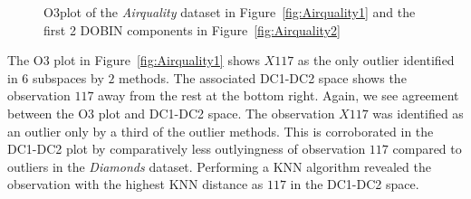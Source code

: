 \documentclass[11pt]{article}
\begin{document}
\begin{figure}
	\centering
	\caption{O3plot of the \textit{Airquality} dataset in Figure~\ref{fig:Airquality1} and the first 2 DOBIN components in Figure~\ref{fig:Airquality2} }
	\label{fig:Airquality}
\end{figure}
The O3 plot in Figure~\ref{fig:Airquality1} shows $X117$ as the only outlier identified in $6$ subspaces by $2$ methods. The associated DC1-DC2 space shows the observation $117$ away from the rest at the bottom right. Again, we see agreement between the O3 plot and DC1-DC2 space. The observation $X117$ was identified as an outlier only by a third of the outlier methods. This is corroborated in the DC1-DC2 plot by comparatively less outlyingness of observation $117$ compared to  outliers in the \textit{Diamonds} dataset. Performing a KNN algorithm revealed the observation with the highest KNN distance as $117$ in the DC1-DC2 space. \\
\end{document}
